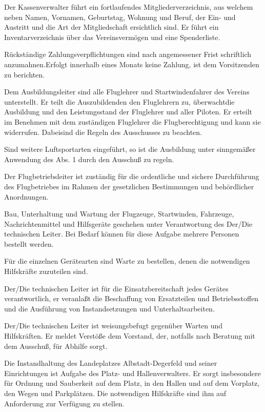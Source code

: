 \documentclass[10pt,a4paper,parskip=half]{scrartcl}
\begin{document}
\begin{contract}
\begin{multicols}{2}
    Der Kassenverwalter führt ein fortlaufendes Mitgliederverzeichnis,
    aus welchem neben Namen,
    Vornamen,
    Geburtstag,
    Wohnung und Beruf,
    der Ein- und Austritt und die Art der Mitgliedschaft ersichtlich sind.
    Er führt ein Inventarverzeichnis über das Vereinsvermögen und eine Spenderliste.
    
    Rückständige Zahlungsverpflichtungen sind nach angemessener Frist schriftlich anzumahnen.Erfolgt innerhalb eines Monats keine Zahlung,
    ist dem Vorsitzenden zu berichten.
    
    Dem Ausbildungsleiter sind alle Fluglehrer und Startwindenfahrer des Vereins unterstellt.
    Er teilt die Auszubildenden den Fluglehrern zu,
    überwachtdie Ausbildung und den Leistungsstand der Fluglehrer und aller Piloten.
    Er erteilt im Benehmen mit dem zuständigen Fluglehrer die Flugberechtigung und kann sie widerrufen.
    Dabeisind die Regeln des Ausschusses zu beachten.
    
    Sind weitere Luftsportarten eingeführt,
    so ist die Ausbildung unter sinngemäßer Anwendung des Abs. 1 durch den Ausschuß zu regeln.
    
    Der Flugbetriebsleiter ist zuständig für die ordentliche und sichere Durchführung des Flugbetriebes im Rahmen der gesetzlichen Bestimmungen und behördlicher Anordnungen.
    
    Bau,
    Unterhaltung und Wartung der Flugzeuge,
    Startwinden,
    Fahrzeuge,
    Nachrichtenmittel und Hilfsgeräte geschehen unter Verantwortung des Der/Die technischen Leiter. Bei Bedarf können für diese Aufgabe mehrere Personen bestellt werden.
    
    Für die einzelnen Gerätearten sind Warte zu bestellen,
    denen die notwendigen Hilfskräfte zuzuteilen sind.
    
    Der/Die technischen Leiter ist für die Einsatzbereitschaft jedes Gerätes verantwortlich,
    er veranlaßt die Beschaffung von Ersatzteilen und Betriebsstoffen und die Ausführung von Instandsetzungen und Unterhaltsarbeiten.
    
    Der/Die technischen Leiter ist weisungsbefugt gegenüber Warten und Hilfskräften.
    Er meldet Verstöße dem Vorstand,
    der,
    notfalls nach Beratung mit dem Ausschuß,
    für Abhilfe sorgt.
    
    Die Instandhaltung des Landeplatzes Albstadt-Degerfeld und seiner Einrichtungen ist Aufgabe des Platz- und Hallenverwalters.
    Er sorgt insbesondere für Ordnung und Sauberkeit auf dem Platz,
    in den Hallen und auf dem Vorplatz,
    den Wegen und Parkplätzen.
    Die notwendigen Hilfskräfte sind ihm auf Anforderung zur Verfügung zu stellen.
    

\end{multicols}
\end{contract}
\end{document}
